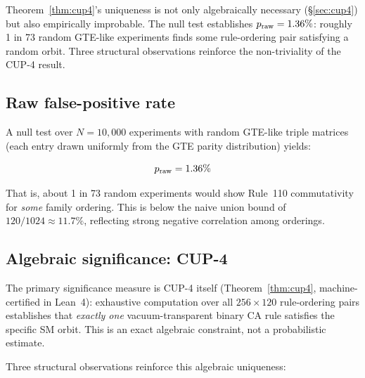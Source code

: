 \documentclass[11pt]{article}
\theoremstyle{remark}
\begin{document}
Theorem~\ref{thm:cup4}'s uniqueness is not only algebraically necessary (\S\ref{sec:cup4})
but also empirically improbable. The null test establishes $p_{\rm raw} = 1.36\%$: roughly
1 in 73 random GTE-like experiments finds some rule-ordering pair satisfying a random orbit.
Three structural observations reinforce the non-triviality of the CUP-4 result.

\subsection{Raw false-positive rate}

A null test over $N = 10{,}000$ experiments with random GTE-like triple matrices
(each entry drawn uniformly from the GTE parity distribution) yields:

\begin{equation}
p_{\rm raw} = 1.36\%
\end{equation}

That is, about 1 in 73 random experiments would show Rule~110 commutativity for
\emph{some} family ordering. This is below the naive union bound of $120/1024 \approx 11.7\%$,
reflecting strong negative correlation among orderings.

\subsection{Algebraic significance: CUP-4}

The primary significance measure is CUP-4 itself (Theorem~\ref{thm:cup4}, machine-certified in Lean~4):
exhaustive computation over all $256 \times 120$ rule-ordering pairs establishes that
\emph{exactly one} vacuum-transparent binary CA rule satisfies the specific SM orbit.
This is an exact algebraic constraint, not a probabilistic estimate.

Three structural observations reinforce this algebraic uniqueness:
\end{document}
